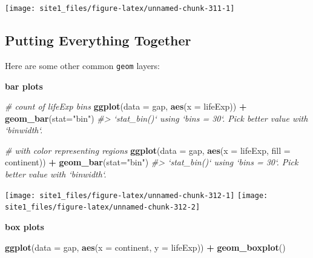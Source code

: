 \documentclass[]{book}
\newenvironment{Shaded}{\begin{snugshade}}{\end{snugshade}}
\newcommand{\CommentTok}[1]{\textcolor[rgb]{0.56,0.35,0.01}{\textit{#1}}}
\newcommand{\DataTypeTok}[1]{\textcolor[rgb]{0.13,0.29,0.53}{#1}}
\newcommand{\KeywordTok}[1]{\textcolor[rgb]{0.13,0.29,0.53}{\textbf{#1}}}
\newcommand{\NormalTok}[1]{#1}
\newcommand{\OperatorTok}[1]{\textcolor[rgb]{0.81,0.36,0.00}{\textbf{#1}}}
\newcommand{\StringTok}[1]{\textcolor[rgb]{0.31,0.60,0.02}{#1}}
\begin{document}
\begin{center}\texttt{[image: site1\_files/figure-latex/unnamed-chunk-311-1]} \end{center}

\hypertarget{putting-everything-together}{%
\subsection{Putting Everything Together}\label{putting-everything-together}}

Here are some other common \texttt{geom} layers:

\textbf{bar plots}

\begin{Shaded}
\begin{Highlighting}[]
\CommentTok{# count of lifeExp bins}
\KeywordTok{ggplot}\NormalTok{(}\DataTypeTok{data =}\NormalTok{ gap, }\KeywordTok{aes}\NormalTok{(}\DataTypeTok{x =}\NormalTok{ lifeExp)) }\OperatorTok{+}\StringTok{ }
\StringTok{  }\KeywordTok{geom_bar}\NormalTok{(}\DataTypeTok{stat=}\StringTok{"bin"}\NormalTok{)}
\CommentTok{#> `stat_bin()` using `bins = 30`. Pick better value with `binwidth`.}

\CommentTok{# with color representing regions}
\KeywordTok{ggplot}\NormalTok{(}\DataTypeTok{data =}\NormalTok{ gap, }\KeywordTok{aes}\NormalTok{(}\DataTypeTok{x =}\NormalTok{ lifeExp, }\DataTypeTok{fill =}\NormalTok{ continent)) }\OperatorTok{+}\StringTok{ }
\StringTok{  }\KeywordTok{geom_bar}\NormalTok{(}\DataTypeTok{stat=}\StringTok{"bin"}\NormalTok{)}
\CommentTok{#> `stat_bin()` using `bins = 30`. Pick better value with `binwidth`.}
\end{Highlighting}
\end{Shaded}

\begin{center}\texttt{[image: site1\_files/figure-latex/unnamed-chunk-312-1]} \texttt{[image: site1\_files/figure-latex/unnamed-chunk-312-2]} \end{center}

\textbf{box plots}

\begin{Shaded}
\begin{Highlighting}[]
\KeywordTok{ggplot}\NormalTok{(}\DataTypeTok{data =}\NormalTok{ gap, }\KeywordTok{aes}\NormalTok{(}\DataTypeTok{x =}\NormalTok{ continent, }\DataTypeTok{y =}\NormalTok{ lifeExp)) }\OperatorTok{+}\StringTok{ }
\StringTok{  }\KeywordTok{geom_boxplot}\NormalTok{()}
\end{Highlighting}
\end{Shaded}
\end{document}
